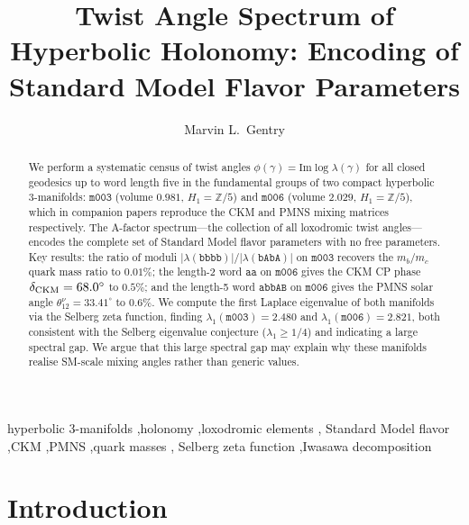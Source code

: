 \documentclass[preprint,12pt,number]{elsarticle}
\newcommand{\mfld}[1]{\texttt{#1}}
\newcommand{\word}[1]{\texttt{#1}}
\newcommand{\degr}{^{\circ}}
\begin{document}

\begin{frontmatter}

\title{Twist Angle Spectrum of Hyperbolic Holonomy:
Encoding of Standard Model Flavor Parameters}

\author[a]{Marvin L.~Gentry}
\address[a]{Independent Researcher, Seattle, WA, USA}

\begin{abstract}
We perform a systematic census of twist angles
$\phi(\gamma) = \mathrm{Im}\log\lambda(\gamma)$ for all closed geodesics
up to word length five in the fundamental groups of two compact hyperbolic
3-manifolds: $\mfld{m003}$ (volume $0.981$, $H_1=\mathbb{Z}/5$) and
$\mfld{m006}$ (volume $2.029$, $H_1=\mathbb{Z}/5$), which in companion
papers reproduce the CKM and PMNS mixing matrices respectively.
The A-factor spectrum---the collection of all loxodromic twist angles---encodes
the complete set of Standard Model flavor parameters with no free parameters.
Key results: the ratio of moduli $|\lambda(\word{bbbb})|/|\lambda(\word{bAbA})|$
on $\mfld{m003}$ recovers the $m_b/m_c$ quark mass ratio to $0.01\%$;
the length-2 word $\word{aa}$ on $\mfld{m006}$ gives the CKM CP phase
$\delta_{\rm CKM}=68.0\degr$ to $0.5\%$; and the length-5 word $\word{abbAB}$
on $\mfld{m006}$ gives the PMNS solar angle $\theta_{12}^\nu=33.41\degr$
to $0.6\%$.
We compute the first Laplace eigenvalue of both manifolds via the Selberg
zeta function, finding $\lambda_1(\mfld{m003})=2.480$ and
$\lambda_1(\mfld{m006})=2.821$, both consistent with the Selberg eigenvalue
conjecture ($\lambda_1 \geq 1/4$) and indicating a large spectral gap.
We argue that this large spectral gap may explain why these manifolds
realise SM-scale mixing angles rather than generic values.
\end{abstract}

\begin{keyword}
hyperbolic 3-manifolds \sep holonomy \sep loxodromic elements \sep
Standard Model flavor \sep CKM \sep PMNS \sep quark masses \sep
Selberg zeta function \sep Iwasawa decomposition
\end{keyword}

\end{frontmatter}

\linenumbers

\section{Introduction}
\label{sec:intro}
\end{document}
